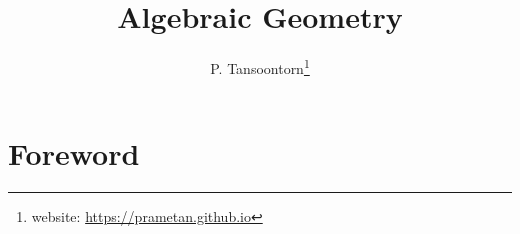 \documentclass[12pt]{book}
\theoremstyle{definition}
\begin{document}
	\frontmatter
	\title{Algebraic Geometry\\  \quad{}}
	\author{P. Tansoontorn\thanks{website: \url{https://prametan.github.io}}}
	\maketitle
	
	\pagestyle{main}
	\tableofcontents
	
	\chapter*{Foreword}
\end{document}

